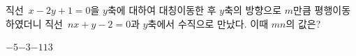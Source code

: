 직선~$x-2y+1=0$을 $y$축에 대하여 대칭이동한 후 $y$축의 방향으로 $m$만큼 평행이동하였더니 직선~$nx+y-2=0$과 $y$축에서 수직으로 만났다. 이때 $mn$의 값은? 
\begin{choices32}{$-5$}{$-3$}{$-1$}{$1$}{$3$}\end{choices32}
